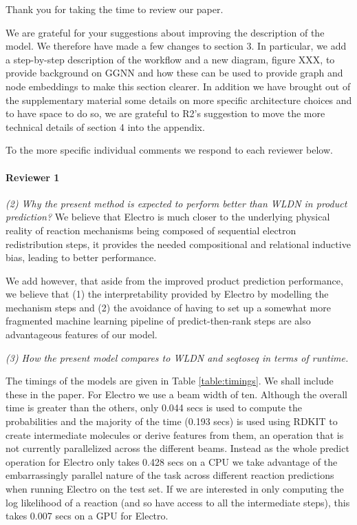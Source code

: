 \documentclass{article}
\begin{document}
Thank you for taking the time to review our paper. 


We are grateful for your suggestions about improving the description of the model. We therefore have made a few changes to section 3.
In particular, we add a step-by-step description of the workflow and a new diagram, figure XXX, to provide background on GGNN and how these can be used to provide graph and node embeddings to make this section clearer. 
In addition we have brought out of the supplementary material some details on more specific architecture choices and to have space to do so, we are grateful to R2's suggestion to move the more technical details of section 4 into the appendix.

To the more specific individual comments we respond to each reviewer below.

\paragraph{Reviewer 1}

\emph{(2) Why the present method is expected to perform better than WLDN in product prediction?}
We believe that Electro is much closer to the underlying physical reality of reaction mechanisms being composed of sequential electron redistribution steps, it provides the needed compositional and relational inductive bias, leading to better performance.

We add however, that aside from the improved product prediction performance, we believe that  (1) the interpretability provided by Electro by modelling the mechanism steps and (2) the avoidance of having to set up a somewhat more fragmented machine learning pipeline of predict-then-rank steps are also advantageous features of our model.

\emph{(3) How the present model compares to WLDN and seqtoseq in terms of runtime.}


The timings of the models are given in Table \ref{table:timings}. We shall include these in the paper.
 For Electro we use a beam width of ten. 
 Although the overall time is greater than the others, only 0.044 secs is used to compute the probabilities and the majority of the time (0.193 secs) is used using RDKIT to create intermediate molecules or derive features from them, an operation that is not currently parallelized across the different beams. 
 Instead as the whole predict operation for Electro only takes 0.428 secs on a CPU we take advantage of the embarrassingly parallel nature of the task across different reaction predictions when running Electro on the test set.
 If we are interested in only computing the log likelihood of a reaction (and so have access to all the intermediate steps), this takes 0.007 secs on a GPU for Electro.
 
\end{document}
